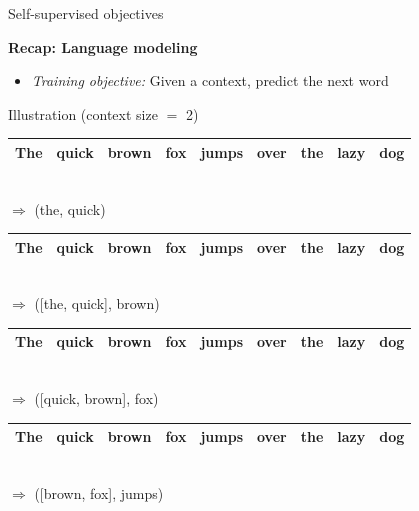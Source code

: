 \documentclass[11pt,compress,t,notes=noshow, xcolor=table]{beamer}
\begin{document}
\begin{frame}{Self-supervised objectives}

\vfill

\textbf{Recap: Language modeling}
	
	\begin{itemize}
		\item \textit{Training objective:} Given a context, predict the next word
	\end{itemize}
	
\begin{block}{Illustration (context size $=$ 2)}
\begin{tabular}{|c|c|c|cccccc|}
\hline
\cellcolor{blue!15}The & \cellcolor{blue!65}quick & brown & fox & jumps & over & the & lazy & dog \\
\hline
\end{tabular}\\
$\Rightarrow$ \quad (the, quick)
\begin{tabular}{|c|c|c|c|ccccc|}
\hline
\cellcolor{blue!15}The & \cellcolor{blue!15}quick & \cellcolor{blue!65}brown & fox & jumps & over & the & lazy & dog \\
\hline
\end{tabular}\\
$\Rightarrow$ \quad ([the, quick], brown)
\begin{tabular}{|c|c|c|c|ccccc|}
\hline
The & \cellcolor{blue!15}quick & \cellcolor{blue!15}brown & \cellcolor{blue!65}fox & jumps & over & the & lazy & dog \\
\hline
\end{tabular}\\
$\Rightarrow$ \quad ([quick, brown], fox)
\begin{tabular}{|c|c|c|c|ccccc|}
\hline
The & quick & \cellcolor{blue!15}brown & \cellcolor{blue!15}fox & \cellcolor{blue!65}jumps & over & the & lazy & dog \\
\hline
\end{tabular}\\
$\Rightarrow$ \quad ([brown, fox], jumps)
\end{block}
	
\vfill

\end{frame}

\end{document}
